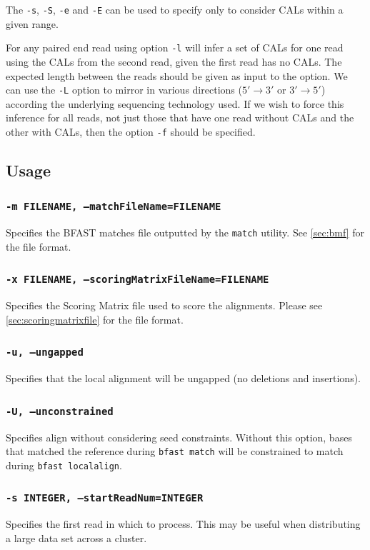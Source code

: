 \documentclass[a4paper,12pt]{book}
\newcommand{\TT}[1]{{\tt #1}} %
\newcommand{\BMF}{BFAST matches file} %
\begin{document}
The \TT{-s}, \TT{-S}, \TT{-e} and \TT{-E} can be used to specify only to consider CALs within a given range.

For any paired end read using option \TT{-l} will infer a set of CALs for one read using the CALs from the second read, given the first read has no CALs.
The expected length between the reads should be given as input to the option.
We can use the \TT{-L} option to mirror in various directions ($5'\rightarrow 3'$ or $3'\rightarrow 5'$) according the underlying sequencing technology used. 
If we wish to force this inference for all reads, not just those that have one read without CALs and the other with CALs, then the option \TT{-f} should be specified.

\subsection{Usage}
\subsubsection{\TT{-m FILENAME, --matchFileName=FILENAME}}
Specifies the \BMF{} outputted by the \TT{match} utility.
See \autoref{sec:bmf} for the file format.

\subsubsection{\TT{-x FILENAME, --scoringMatrixFileName=FILENAME}}
Specifies the Scoring Matrix file used to score the alignments.
Please see \autoref{sec:scoringmatrixfile} for the file format.

\subsubsection{\TT{-u, --ungapped}}
Specifies that the local alignment will be ungapped (no deletions and insertions).

\subsubsection{\TT{-U, --unconstrained}}
Specifies align without considering seed constraints.  
Without this option, bases that matched the reference during \TT{bfast match} will be constrained to match during \TT{bfast localalign}.

\subsubsection{\TT{-s INTEGER, --startReadNum=INTEGER}}
Specifies the first read in which to process.
This may be useful when distributing a large data set across a cluster.
\end{document}
